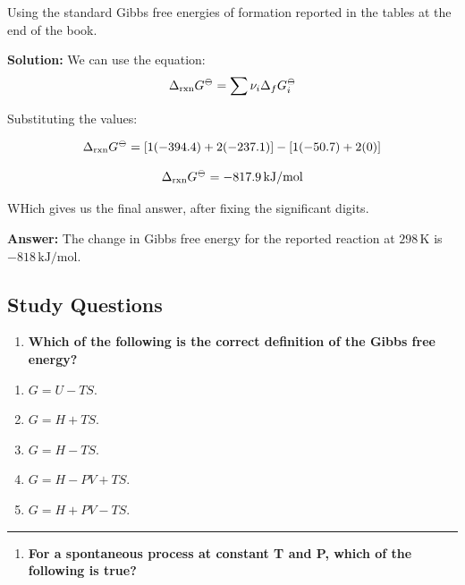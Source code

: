 \documentclass[
  9pt,
]{extbook}
\providecommand{\tightlist}{%
  \setlength{\itemsep}{0pt}\setlength{\parskip}{0pt}}
\theoremstyle{definition}
\theoremstyle{definition}
\theoremstyle{definition}
\theoremstyle{remark}
\begin{document}
Using the standard Gibbs free energies of formation reported in the tables at the end of the book.

\textbf{Solution:} We can use the equation: \[\Delta_{\text{rxn}}G^{{-\kern-6pt{\ominus}\kern-6pt-}} = \sum \nu_i \Delta_f G^{{-\kern-6pt{\ominus}\kern-6pt-}}_i \]

Substituting the values:

\[\Delta_{\text{rxn}}G^{{-\kern-6pt{\ominus}\kern-6pt-}} = [1(-394.4) + 2(-237.1)] - [1(-50.7) + 2(0)]\]

\[\Delta_{\text{rxn}}G^{{-\kern-6pt{\ominus}\kern-6pt-}} = -817.9\,\text{kJ/mol}\]

WHich gives us the final answer, after fixing the significant digits.

\textbf{Answer:} The change in Gibbs free energy for the reported reaction at \(298\,\text{K}\) is \(-818\,\text{kJ/mol}\).

\hypertarget{quest9}{%
\subsection{Study Questions}\label{quest9}}

\begin{enumerate}
\def\labelenumi{\arabic{enumi}.}
\tightlist
\item
  \textbf{Which of the following is the correct definition of the Gibbs free energy?}
\end{enumerate}

\begin{enumerate}
\def\labelenumi{\alph{enumi}.}
\tightlist
\item
  \(G = U - TS\).
\item
  \(G = H + TS\).
\item
  \(G = H - TS\).
\item
  \(G = H - PV + TS\).
\item
  \(G = H + PV - TS\).
\end{enumerate}

\begin{center}\rule{0.5\linewidth}{0.5pt}\end{center}

\begin{enumerate}
\def\labelenumi{\arabic{enumi}.}
\setcounter{enumi}{1}
\tightlist
\item
  \textbf{For a spontaneous process at constant T and P, which of the following is true?}
\end{enumerate}
\end{document}
